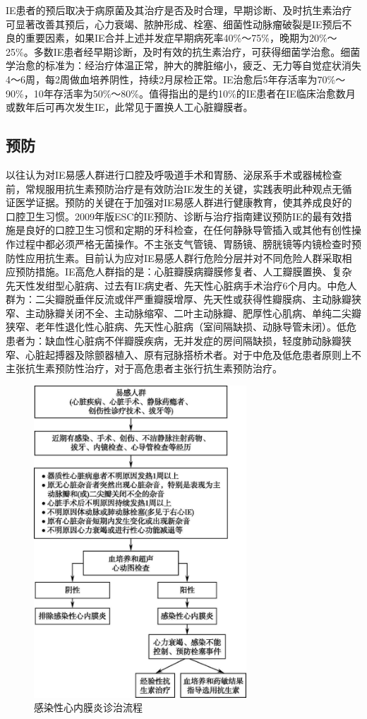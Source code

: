 IE患者的预后取决于病原菌及其治疗是否及时合理，早期诊断、及时抗生素治疗可显著改善其预后，心力衰竭、脓肿形成、栓塞、细菌性动脉瘤破裂是IE预后不良的重要因素，如果IE合并上述并发症早期病死率40\%～75\%，晚期为20\%～25\%。多数IE患者经早期诊断，及时有效的抗生素治疗，可获得细菌学治愈。细菌学治愈的标准为：经治疗体温正常，肿大的脾脏缩小，疲乏、无力等自觉症状消失4～6周，每2周做血培养阴性，持续2月尿检正常。IE治愈后5年存活率为70\%～90\%，10年存活率为50\%～80\%。值得指出的是约10\%的IE患者在IE临床治愈数月或数年后可再次发生IE，此常见于置换人工心脏瓣膜者。

\subsection{预防}

以往认为对IE易感人群进行口腔及呼吸道手术和胃肠、泌尿系手术或器械检查前，常规服用抗生素预防治疗是有效防治IE发生的关键，实践表明此种观点无循证医学证据。预防的关键在于加强对IE易感人群进行健康教育，使其养成良好的口腔卫生习惯。2009年版ESC的IE预防、诊断与治疗指南建议预防IE的最有效措施是良好的口腔卫生习惯和定期的牙科检查，在任何静脉导管插入或其他有创性操作过程中都必须严格无菌操作。不主张支气管镜、胃肠镜、膀胱镜等内镜检查时预防性应用抗生素。目前认为应对IE易感人群行危险分层并对不同危险人群采取相应预防措施。IE高危人群指的是：心脏瓣膜病瓣膜修复者、人工瓣膜置换、复杂先天性发绀型心脏病、过去有IE病史者、先天性心脏病手术治疗6个月内。中危人群为：二尖瓣脱垂伴反流或伴严重瓣膜增厚、先天性或获得性瓣膜病、主动脉瓣狭窄、主动脉瓣关闭不全、主动脉缩窄、二叶主动脉瓣、肥厚性心肌病、单纯二尖瓣狭窄、老年性退化性心脏病、先天性心脏病（室间隔缺损、动脉导管未闭）。低危患者为：缺血性心脏病不伴瓣膜疾病，无并发症的房间隔缺损，轻度肺动脉瓣狭窄、心脏起搏器及除颤器植入、原有冠脉搭桥术者。对于中危及低危患者原则上不主张抗生素预防性治疗，对于高危患者主张行抗生素预防治疗。

\begin{figure}[!htbp]
 \centering
 \includegraphics[width=3.13542in,height=4.60417in]{./images/Image00469.jpg}
 \captionsetup{justification=centering}
 \caption{感染性心内膜炎诊治流程}
 \label{fig103-1}
  \end{figure} 

